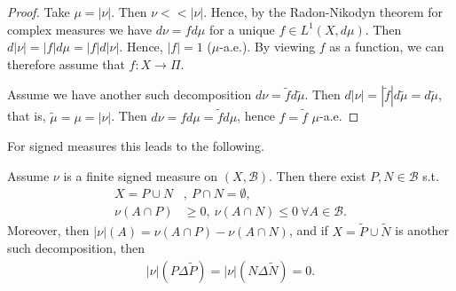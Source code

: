 \ifdetailed
\begin{proof}
    Take \(\mu = |\nu|\). Then \(\nu<<|\nu|\). Hence, by the Radon-Nikodyn theorem for complex measures we have \(d\nu=fd\mu\) for a unique \(f\in L^1(X,d\mu)\). Then \(d|\nu| = |f|d\mu = |f|d|\nu|\). Hence, \(|f| = 1\) (\(\mu\)-a.e.). By viewing \(f\) as a function, we can therefore assume that \(f:X\rightarrow \Pi\).

    Assume we have another such decomposition \(d\nu = \tilde{f}d\tilde{\mu}\). Then \(d|\nu|=|\tilde{f}|d\tilde{\mu}=d\tilde{\mu}\), that is, \(\tilde{\mu}=\mu=|\nu|\). Then \(d\nu = fd\mu = \tilde{f}d\mu\), hence \(f=\tilde{f}\) \(\mu\)-a.e.
\end{proof}
\fi 
For signed measures this leads to the following.
\begin{theorem}
    Assume \(\nu\) is a finite signed measure on \((X,\mathscr{B})\). Then there exist \(P,N\in\mathscr{B}\) s.t. 
    \begin{align*}
        X = P\cup N &, \ P\cap N = \emptyset, \\
        \nu\left(A\cap P\right) &\geq 0, \ \nu\left(A\cap N\right) \leq 0 \ \forall A\in\mathscr{B}.
    \end{align*}
    Moreover, then \(|\nu|(A) = \nu\left(A\cap P\right) - \nu\left(A\cap N\right)\), and if \(X = \tilde{P}\cup \tilde{N}\) is another such decomposition, then 
    \begin{align*}
        |\nu|\left(P\Delta \tilde{P}\right) = |\nu|\left(N\Delta\tilde{N}\right) = 0.
    \end{align*}
\end{theorem}
\ifdetailed
